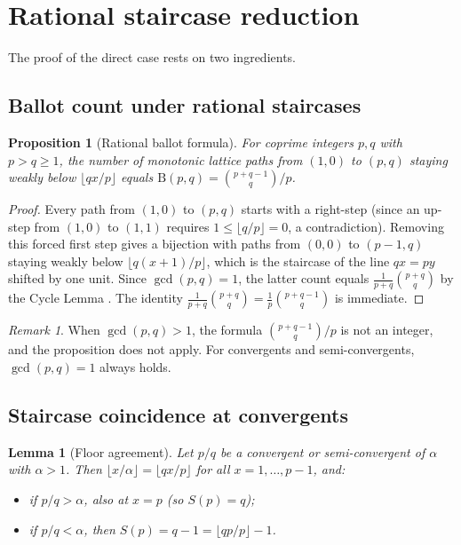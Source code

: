\documentclass[11pt]{article}
\newtheorem{lemma}[theorem]{Lemma}
\newtheorem{proposition}[theorem]{Proposition}
\theoremstyle{definition}
\theoremstyle{remark}
\newtheorem{remark}[theorem]{Remark}
\newcommand{\floor}[1]{\lfloor #1 \rfloor}
\newcommand{\B}{\mathrm{B}}
\begin{document}
\section{Rational staircase reduction}\label{sec:rational}

The proof of the direct case rests on two ingredients.

\subsection{Ballot count under rational staircases}

\begin{proposition}[Rational ballot formula]\label{prop:rational}
For coprime integers $p, q$ with $p > q \geq 1$, the number of monotonic lattice paths from $(1, 0)$ to $(p, q)$ staying weakly below $\floor{qx/p}$ equals
$\B(p, q) = \binom{p+q-1}{q}/p$.
\end{proposition}

\begin{proof}
Every path from $(1,0)$ to $(p,q)$ starts with a right-step (since an up-step from $(1,0)$ to $(1,1)$ requires $1 \leq \floor{q/p} = 0$, a contradiction).
Removing this forced first step gives a bijection with paths from $(0,0)$ to $(p-1,q)$ staying weakly below $\floor{q(x+1)/p}$, which is the staircase of the line $qx = py$ shifted by one unit.
Since $\gcd(p,q) = 1$, the latter count equals $\frac{1}{p+q}\binom{p+q}{q}$ by the Cycle Lemma \cite[Theorem~10.4.1]{Krattenthaler2015}.
The identity $\frac{1}{p+q}\binom{p+q}{q} = \frac{1}{p}\binom{p+q-1}{q}$ is immediate.
\end{proof}

\begin{remark}
When $\gcd(p, q) > 1$, the formula $\binom{p+q-1}{q}/p$ is not an integer, and the proposition does not apply. For convergents and semi-convergents, $\gcd(p, q) = 1$ always holds.
\end{remark}

\subsection{Staircase coincidence at convergents}

\begin{lemma}[Floor agreement]\label{lem:floor}
Let $p/q$ be a convergent or semi-convergent of $\alpha$ with $\alpha > 1$.
Then $\floor{x/\alpha} = \floor{qx/p}$ for all $x = 1, \ldots, p-1$, and:
\begin{itemize}
  \item if $p/q > \alpha$, also at $x = p$ (so $S(p) = q$);
  \item if $p/q < \alpha$, then $S(p) = q - 1 = \floor{qp/p} - 1$.
\end{itemize}
\end{lemma}
\end{document}
